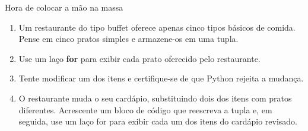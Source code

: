\begin{frame}{Hora de colocar a mão na massa}
  \begin{enumerate}
    \item Um restaurante do tipo buffet oferece apenas cinco tipos básicos de comida. Pense em cinco pratos simples e armazene-os em uma tupla.
    \item Use um laço {\bf for} para exibir cada prato oferecido pelo restaurante.
    \item Tente modificar um dos itens e certifique-se de que Python rejeita a mudança.
    \item O restaurante muda o seu cardápio, substituindo dois dos itens com pratos diferentes. Acrescente um bloco de código que reescreva a tupla e, em seguida, use um laço for para exibir cada um dos itens do cardápio revisado.
  \end{enumerate}
\end{frame}